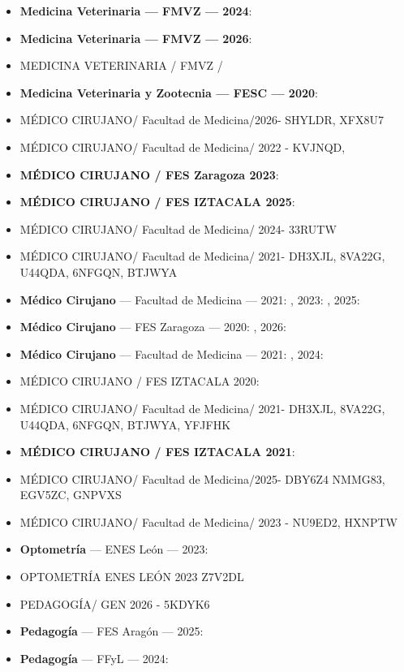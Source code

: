\begin{itemize}[leftmargin=*]
  \item \textbf{Medicina Veterinaria --- FMVZ --- 2024}: 
  \item \textbf{Medicina Veterinaria --- FMVZ --- 2026}: 
  \item MEDICINA VETERINARIA / FMVZ /
  \item \textbf{Medicina Veterinaria y Zootecnia --- FESC --- 2020}: 
  \item MÉDICO CIRUJANO/ Facultad de Medicina/2026- SHYLDR, XFX8U7
  \item MÉDICO CIRUJANO/ Facultad de Medicina/ 2022 - KVJNQD,
  \item \textbf{MÉDICO CIRUJANO / FES Zaragoza 2023}: 
  \item \textbf{MÉDICO CIRUJANO / FES IZTACALA 2025}: 
  \item MÉDICO CIRUJANO/ Facultad de Medicina/ 2024- 33RUTW
  \item MÉDICO CIRUJANO/ Facultad de Medicina/ 2021- DH3XJL, 8VA22G, U44QDA, 6NFGQN, BTJWYA
  \item \textbf{Médico Cirujano} --- Facultad de Medicina --- 2021: , 2023: , 2025: 
  \item \textbf{Médico Cirujano} --- FES Zaragoza --- 2020: , 2026: 
  \item \textbf{Médico Cirujano} --- Facultad de Medicina --- 2021: , 2024: 
  \item MÉDICO CIRUJANO / FES IZTACALA 2020:
  \item MÉDICO CIRUJANO/ Facultad de Medicina/ 2021- DH3XJL, 8VA22G, U44QDA, 6NFGQN, BTJWYA, YFJFHK
  \item \textbf{MÉDICO CIRUJANO / FES IZTACALA 2021}: 
  \item MÉDICO CIRUJANO/ Facultad de Medicina/2025- DBY6Z4 NMMG83, EGV5ZC, GNPVXS
  \item MÉDICO CIRUJANO/ Facultad de Medicina/ 2023 - NU9ED2, HXNPTW
  \item \textbf{Optometría} --- ENES León --- 2023: 
  \item OPTOMETRÍA ENES LEÓN 2023 Z7V2DL
  \item PEDAGOGÍA/ GEN 2026 - 5KDYK6
  \item \textbf{Pedagogía} --- FES Aragón --- 2025: 
  \item \textbf{Pedagogía} --- FFyL --- 2024: 

\end{itemize}
